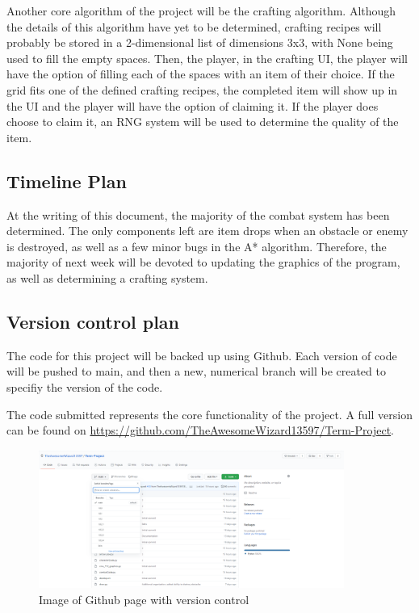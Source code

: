 \documentclass[12pt]{article}
\begin{document}
Another core algorithm of the project will be the crafting algorithm.
Although the details of this algorithm have yet to be determined, 
crafting recipes will probably be stored in a 2-dimensional list of 
dimensions 3x3, with None being used to fill the empty spaces. Then, the player, 
in the crafting UI, the player will have the option of filling each of 
the spaces with an item of their choice. If the grid fits one of the
defined crafting recipes, the completed item will show up in the UI
and the player will have the option of claiming it. If the player
does choose to claim it, an RNG system will be used to determine the quality
of the item. 

\subsection{Timeline Plan}
At the writing of this document, the majority of the combat system has 
been determined. The only components left are item drops when an obstacle
or enemy is destroyed, as well as a few minor bugs in the A* algorithm.
Therefore, the majority of next week will be devoted to updating the 
graphics of the program, as well as determining a crafting system. 

\subsection{Version control plan}
The code for this project will be backed up using Github. Each version
of code will be pushed to main, and then a new, numerical branch will
be created to specifiy the version of the code. 

The code submitted represents the core functionality of the project. 
A full version can be found on 
\url{https://github.com/TheAwesomeWizard13597/Term-Project}.

\begin{figure}[h]
    \centering
    \includegraphics[width = 10cm]{Capture}
    \caption{Image of Github page with version control}
\end{figure}
\end{document}
